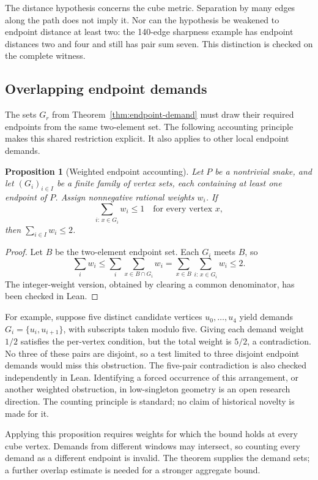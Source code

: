 \documentclass[11pt,a4paper]{article}
\newtheorem{proposition}[theorem]{Proposition}
\theoremstyle{definition}
\theoremstyle{remark}
\begin{document}
The distance hypothesis concerns the cube metric. Separation by many edges along the path does not imply it. Nor can the hypothesis be weakened to endpoint distance at least two: the 140-edge sharpness example has endpoint distances two and four and still has pair sum seven. This distinction is checked on the complete witness.

\subsection{Overlapping endpoint demands}
The sets $G_r$ from Theorem~\ref{thm:endpoint-demand} must draw their required endpoints from the same two-element set. The following accounting principle makes this shared restriction explicit. It also applies to other local endpoint demands.
\begin{proposition}[Weighted endpoint accounting]\label{prop:endpoint-accounting}
Let $P$ be a nontrivial snake, and let $(G_i)_{i\in I}$ be a finite family of vertex sets, each containing at least one endpoint of $P$. Assign nonnegative rational weights $w_i$. If
\[
\sum_{i:\,x\in G_i} w_i\le1
\quad\text{for every vertex }x,
\]
then $\sum_{i\in I}w_i\le2$.
\end{proposition}
\begin{proof}
Let $B$ be the two-element endpoint set. Each $G_i$ meets $B$, so
\[
\sum_i w_i\le\sum_i\sum_{x\in B\cap G_i}w_i
=\sum_{x\in B}\sum_{i:\,x\in G_i}w_i\le2.
\]
The integer-weight version, obtained by clearing a common denominator, has been checked in Lean.
\end{proof}

For example, suppose five distinct candidate vertices $u_0,\ldots,u_4$ yield demands $G_i=\{u_i,u_{i+1}\}$, with subscripts taken modulo five. Giving each demand weight $1/2$ satisfies the per-vertex condition, but the total weight is $5/2$, a contradiction. No three of these pairs are disjoint, so a test limited to three disjoint endpoint demands would miss this obstruction. The five-pair contradiction is also checked independently in Lean. Identifying a forced occurrence of this arrangement, or another weighted obstruction, in low-singleton geometry is an open research direction. The counting principle is standard; no claim of historical novelty is made for it.

Applying this proposition requires weights for which the bound holds at every cube vertex. Demands from different windows may intersect, so counting every demand as a different endpoint is invalid. The theorem supplies the demand sets; a further overlap estimate is needed for a stronger aggregate bound.
\end{document}

